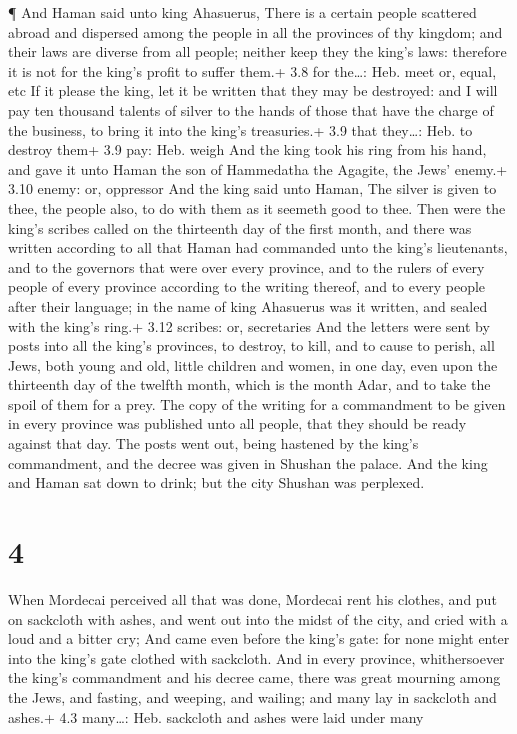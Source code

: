  ¶ And Haman said unto king Ahasuerus, There is a certain
people scattered abroad and dispersed among the people in all the
provinces of thy kingdom; and their laws are diverse from all people;
neither keep they the king's laws: therefore it is not for the king's
profit to suffer them.+ 3.8 for the\ldots: Heb. meet or, equal, etc
 If it please the king, let it be written that they may be
destroyed: and I will pay ten thousand talents of silver to the hands of
those that have the charge of the business, to bring it into the king's
treasuries.+ 3.9 that they\ldots: Heb. to destroy them+ 3.9 pay: Heb.
weigh  And the king took his ring from his hand, and gave
it unto Haman the son of Hammedatha the Agagite, the Jews' enemy.+ 3.10
enemy: or, oppressor  And the king said unto Haman, The
silver is given to thee, the people also, to do with them as it seemeth
good to thee.  Then were the king's scribes called on the
thirteenth day of the first month, and there was written according to
all that Haman had commanded unto the king's lieutenants, and to the
governors that were over every province, and to the rulers of every
people of every province according to the writing thereof, and to every
people after their language; in the name of king Ahasuerus was it
written, and sealed with the king's ring.+ 3.12 scribes: or, secretaries
 And the letters were sent by posts into all the king's
provinces, to destroy, to kill, and to cause to perish, all Jews, both
young and old, little children and women, in one day, even upon the
thirteenth day of the twelfth month, which is the month Adar, and to
take the spoil of them for a prey.  The copy of the writing
for a commandment to be given in every province was published unto all
people, that they should be ready against that day.  The
posts went out, being hastened by the king's commandment, and the decree
was given in Shushan the palace. And the king and Haman sat down to
drink; but the city Shushan was perplexed.

\hypertarget{section-3}{%
\section{4}\label{section-3}}

 When Mordecai perceived all that was done, Mordecai rent
his clothes, and put on sackcloth with ashes, and went out into the
midst of the city, and cried with a loud and a bitter cry; 
And came even before the king's gate: for none might enter into the
king's gate clothed with sackcloth.  And in every province,
whithersoever the king's commandment and his decree came, there was
great mourning among the Jews, and fasting, and weeping, and wailing;
and many lay in sackcloth and ashes.+ 4.3 many\ldots: Heb. sackcloth and
ashes were laid under many

